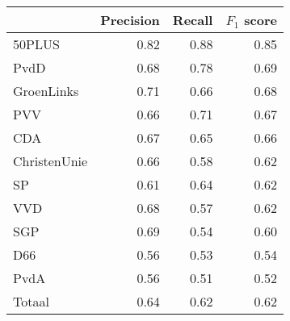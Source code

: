 \begin{tabular}{lrrr}
\toprule
{} &  Precision &  Recall &  $F_1$ score \\
\midrule
50PLUS       &       0.82 &    0.88 &      0.85\\
PvdD         &       0.68 &    0.78 &      0.69 \\
GroenLinks   &       0.71 &    0.66 &      0.68  \\
PVV          &       0.66 &    0.71 &      0.67  \\
CDA          &       0.67 &    0.65 &      0.66  \\
ChristenUnie &       0.66 &    0.58 &      0.62 \\
SP           &       0.61 &    0.64 &      0.62  \\
VVD          &       0.68 &    0.57 &      0.62  \\
SGP          &       0.69 &    0.54 &      0.60  \\
D66          &       0.56 &    0.53 &      0.54  \\
PvdA         &       0.56 &    0.51 &      0.52  \\
\midrule
Totaal       &       0.64 &    0.62 &      0.62  \\
\bottomrule
\end{tabular}
